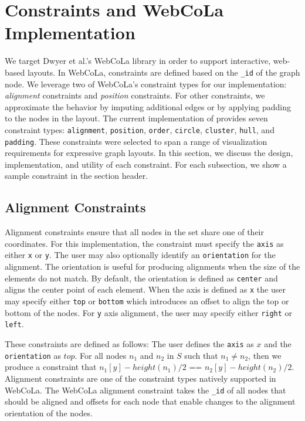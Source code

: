 \section{\projectname Constraints and WebCoLa Implementation}
\label{sec:constraints}

We target  Dwyer et al.'s WebCoLa library \cite{WebCoLa} in order to support
interactive, web-based layouts.
In WebCoLa, constraints are defined based on the \texttt{\_id} of the
graph node. We leverage two of WebCoLa's
constraint types for our implementation: \emph{alignment} constraints 
and \emph{position} constraints. For other \projectname constraints, we
approximate the behavior by imputing additional edges or by applying
padding to the nodes in the layout. The current implementation of
\projectname provides seven constraint types:
\texttt{alignment}, \texttt{position}, \texttt{order}, \texttt{circle},
\texttt{cluster}, \texttt{hull}, and \texttt{padding}. These constraints
were selected to span a range of visualization requirements for expressive
graph layouts. In this section, we discuss the design, implementation, 
and utility of each \projectname constraint. For each subsection, we show 
a sample \projectname constraint in the section header.

\subsection{Alignment Constraints}
Alignment constraints ensure that all nodes in the set share one of their
coordinates. For this implementation, the constraint must specify the \texttt{axis}
as either \texttt{x} or \texttt{y}. 
The user may also optionally identify an \texttt{orientation} for the alignment.
The orientation is useful for producing alignments when the size of the 
elements do not match. By default, the orientation is defined as \texttt{center} 
and aligns the center point of each element. When the axis is defined as \texttt{x} 
the user may specify either \texttt{top} or \texttt{bottom} which introduces 
an offset to align the top or bottom of the nodes. For \texttt{y} axis
alignment, the user may specify either \texttt{right} or \texttt{left}.

These constraints are defined as follows: The user defines the \texttt{axis} 
as $x$ and the \texttt{orientation} as $top$. For all nodes $n_1$ and $n_2$ in $S$ 
such that $n_1 \neq n_2$, then we produce a constraint that
$n_1[y] - height(n_1)/2$ == $n_2[y] - height(n_2)/2$.
Alignment constraints are one of the constraint types natively supported in
WebCoLa. The WebCoLa alignment constraint takes the \texttt{\_id} of all nodes
that should be aligned and offsets for each node that enable changes to the
alignment orientation of the nodes.

